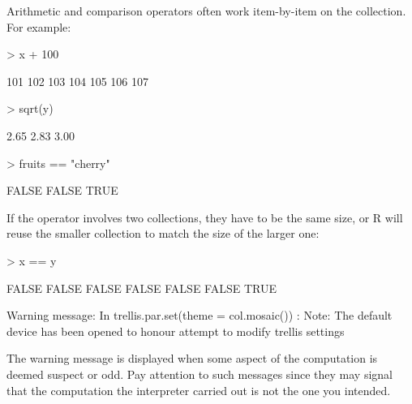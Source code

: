 Arithmetic and comparison operators often work item-by-item on the
collection.  For example:
\begin{Schunk}
\begin{Sinput}
> x + 100
\end{Sinput}
\begin{Soutput}
[1] 101 102 103 104 105 106 107
\end{Soutput}
\begin{Sinput}
> sqrt(y)
\end{Sinput}
\begin{Soutput}
[1] 2.65 2.83 3.00
\end{Soutput}
\begin{Sinput}
> fruits == "cherry"
\end{Sinput}
\begin{Soutput}
[1] FALSE FALSE  TRUE
\end{Soutput}
\end{Schunk}
If the operator involves two collections, they have to be the same
size, or R will reuse the smaller collection to match the size of the
larger one:
\begin{Schunk}
\begin{Sinput}
> x == y
\end{Sinput}
\begin{Soutput}
[1] FALSE FALSE FALSE FALSE FALSE FALSE  TRUE
\end{Soutput}
\end{Schunk}
\begin{Schunk}
\begin{Soutput}
Warning message:
In trellis.par.set(theme = col.mosaic()) :
  Note: The default device has been opened to honour attempt to modify trellis settings
\end{Soutput}
\end{Schunk}
The warning message is displayed when some aspect of the computation
is deemed suspect or odd.  Pay attention to such messages since they
may signal that the computation the interpreter carried out is not the
one you intended.  

